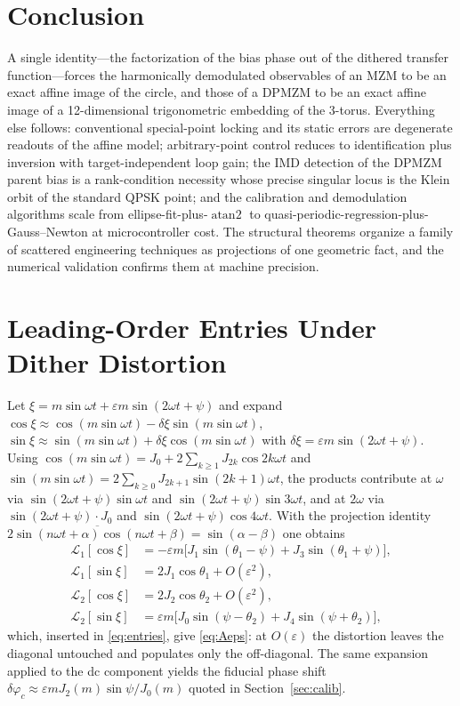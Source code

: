 \documentclass[journal]{IEEEtran}
\newcommand{\Lc}{\mathcal{L}}
\newcommand{\atan}{\operatorname{atan2}}
\begin{document}
\section{Conclusion}
A single identity---the factorization of the bias phase out of the
dithered transfer function---forces the harmonically demodulated
observables of an MZM to be an exact affine image of the circle, and
those of a DPMZM to be an exact affine image of a 12-dimensional
trigonometric embedding of the 3-torus. Everything else follows:
conventional special-point locking and its static errors are degenerate
readouts of the affine model; arbitrary-point control reduces to
identification plus inversion with target-independent loop gain; the
IMD detection of the DPMZM parent bias is a rank-condition necessity
whose precise singular locus is the Klein orbit of the standard QPSK
point; and the calibration and demodulation algorithms scale from
ellipse-fit-plus-$\atan$ to quasi-periodic-regression-plus-Gauss--Newton
at microcontroller cost. The structural theorems organize a family of
scattered engineering techniques as projections of one geometric fact,
and the numerical validation confirms them at machine precision.

\appendices
\section{Leading-Order Entries Under Dither Distortion}
\label{app:eps}
Let $\xi=m\sin\omega t+\varepsilon m\sin(2\omega t+\psi)$ and expand
$\cos\xi\approx\cos(m\sin\omega t)-\delta\xi\sin(m\sin\omega t)$,
$\sin\xi\approx\sin(m\sin\omega t)+\delta\xi\cos(m\sin\omega t)$ with
$\delta\xi=\varepsilon m\sin(2\omega t+\psi)$. Using
$\cos(m\sin\omega t)=J_0+2\sum_{k\ge1}J_{2k}\cos2k\omega t$ and
$\sin(m\sin\omega t)=2\sum_{k\ge0}J_{2k+1}\sin(2k{+}1)\omega t$, the
products contribute at $\omega$ via
$\sin(2\omega t{+}\psi)\sin\omega t$ and
$\sin(2\omega t{+}\psi)\sin3\omega t$, and at $2\omega$ via
$\sin(2\omega t{+}\psi)\cdot J_0$ and
$\sin(2\omega t{+}\psi)\cos4\omega t$. With the projection identity
$\overline{2\sin(n\omega t{+}\alpha)\cos(n\omega t{+}\beta)}
=\sin(\alpha-\beta)$ one obtains
\begin{align}
\Lc_1[\cos\xi]&=-\varepsilon m\bigl[J_1\sin(\theta_1{-}\psi)
+J_3\sin(\theta_1{+}\psi)\bigr],\nonumber\\
\Lc_1[\sin\xi]&=2J_1\cos\theta_1+O(\varepsilon^2),\nonumber\\
\Lc_2[\cos\xi]&=2J_2\cos\theta_2+O(\varepsilon^2),\nonumber\\
\Lc_2[\sin\xi]&=\varepsilon m\bigl[J_0\sin(\psi{-}\theta_2)
+J_4\sin(\psi{+}\theta_2)\bigr],
\end{align}
which, inserted in \eqref{eq:entries}, give \eqref{eq:Aeps}: at
$O(\varepsilon)$ the distortion leaves the diagonal untouched and
populates only the off-diagonal. The same expansion applied to the dc
component yields the fiducial phase shift
$\delta\varphi_c\approx\varepsilon mJ_2(m)\sin\psi/J_0(m)$ quoted in
Section~\ref{sec:calib}.
\end{document}
